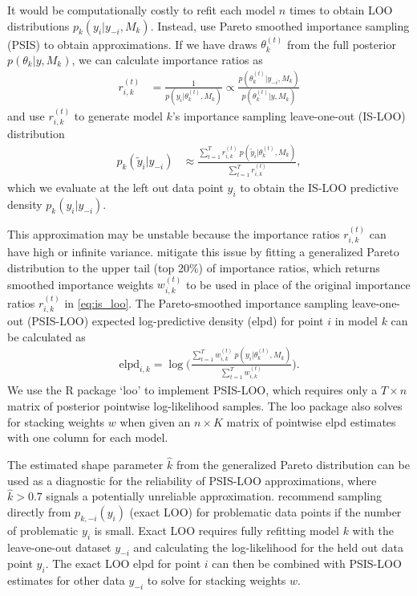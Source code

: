 \documentclass[12pt]{article}   	%
\numberwithin{equation}{section}
\begin{document}
It would be computationally costly to refit each model $n$ times to obtain LOO distributions $p_{k}(y_i \vert y_{-i}, M_k)$. Instead, \citet{yao2018stacking} use Pareto smoothed importance sampling (PSIS) \citep{vehtari2017psis} to obtain approximations. If we have draws $\theta_k^{(t)}$ from the full posterior $p(\theta_k \vert y, M_k)$, we can calculate importance ratios as
\begin{align}
r_{i,k}^{(t)} &= \frac{1}{p(y_i \vert \theta_k^{(t)}, M_k)} \propto \frac{p(\theta_k^{(t)} \vert y_{-i}, M_k)}{p(\theta_k^{(t)} \vert y, M_k)} \label{eq:imporance_ratio}
\end{align}
and use $r_{i,k}^{(t)}$ to generate model $k$'s importance sampling leave-one-out (IS-LOO) distribution 
\begin{align}
p_k(\tilde{y}_i \vert y_{-i}) &\approx \frac{\sum_{t = 1}^T r_{i, k}^{(t)} \: p(\tilde{y}_i \vert \theta_k^{(t)}, M_k)}{\sum_{t=1}^T r_{i, k}^{(t)}}, \label{eq:is_loo}
\end{align}
which we evaluate at the left out data point $y_i$ to obtain the IS-LOO predictive density $p_k(y_i \vert y_{-i})$. 

This approximation may be unstable because the importance ratios $r_{i,k}^{(t)}$ can have high or infinite variance. \citet{vehtari2017psis} mitigate this issue by fitting a generalized Pareto distribution to the upper tail (top 20\%) of importance ratios, which returns smoothed importance weights $w_{i,k}^{(t)}$ to be used in place of the original importance ratios $r_{i,k}^{(t)}$ in \eqref{eq:is_loo}. The Pareto-smoothed importance sampling leave-one-out (PSIS-LOO) expected log-predictive density (elpd) for point $i$ in model $k$ can be calculated as
\begin{align}
\text{elpd}_{i,k} = \log \Bigg( \frac{\sum_{t=1}^T w_{i,k}^{(t)} \: p(y_i \vert \theta_k^{(t)}, M_k)}{\sum_{t=1}^T w_{i,k}^{(t)}} \Bigg). \label{eq:elpd_loo}
\end{align}
We use the R package `loo' \citep{vehtari2020loo} to implement PSIS-LOO, which requires only a $T \times n$ matrix of posterior pointwise log-likelihood samples. The loo package also solves for stacking weights $w$ when given an $n \times K$ matrix of pointwise elpd estimates with one column for each model. 

The estimated shape parameter $\hat{k}$ from the generalized Pareto distribution can be used as a diagnostic for the reliability of PSIS-LOO approximations, where $\hat{k} > 0.7$ signals a potentially unreliable approximation. \citet{vehtari2017psis} recommend sampling directly from $p_{k, -i}(y_i)$ (exact LOO) for problematic data points if the number of problematic $y_i$ is small. Exact LOO requires fully refitting model $k$ with the leave-one-out dataset $y_{-i}$ and calculating the log-likelihood for the held out data point $y_i$. The exact LOO elpd for point $i$ can then be combined with PSIS-LOO estimates for other data $y_{-i}$ to solve for stacking weights $w$. 
\end{document}
